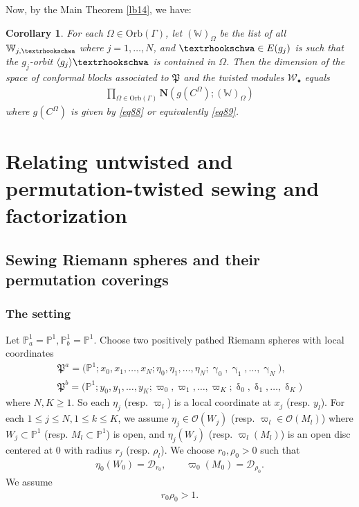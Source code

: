 \documentclass[12pt,a4paper,notitlepage]{article}
\theoremstyle{definition}
\theoremstyle{plain}
\newtheorem{co}[df]{Corollary}
\newcommand{\fk}{\mathfrak}
\newcommand{\mc}{\mathcal}
\newcommand{\bk}[1]{\langle {#1}\rangle}
\newcommand{\scr}{\mathscr}
\newcommand{\blt}{\bullet}
\newcommand{\Wbb}{\mathbb W}
\newcommand{\Pbb}{\mathbb P}
\newcommand{\Nbf}{\mathbf N}
\newcommand{\Orb}{\mathrm{Orb}}
\newcommand{\tipae}{\text{\textrhookschwa}}
\numberwithin{equation}{subsection}
\begin{document}
\begin{subappendices}
Now, by the Main Theorem \ref{lb14}, we have:

\begin{co}
For each $\Omega\in\Orb(\Gamma)$, let $(\Wbb)_\Omega$ be the list of all $\Wbb_{j,\tipae}$ where $j=1,\dots,N$, and $\tipae\in E(g_j)$ is such that the $g_j$-orbit $\bk{g_j}\tipae$ is contained in $\Omega$. Then the dimension of the space of conformal blocks associated to $\fk P$ and the twisted modules $\mc W_\blt$ equals
\begin{align*}
\prod_{\Omega\in\Orb(\Gamma)}\Nbf(g(C^\Omega);(\Wbb)_\Omega)	
\end{align*}
where $g(C^\Omega)$ is given by \eqref{eq88} or equivalently \eqref{eq89}.
\end{co}










	
\end{subappendices}	


\section{Relating untwisted and permutation-twisted sewing and factorization}\label{lb35}

\subsection{Sewing Riemann spheres and their permutation coverings}\label{lb59}


\subsubsection{The setting}\label{lb45}

Let $\Pbb^1_a=\Pbb^1,\Pbb^1_b=\Pbb^1$. Choose two positively pathed Riemann spheres with local coordinates
\begin{gather*}
\fk P^a=\big(\Pbb^1;x_0,x_1,\dots,x_N;\eta_0,\eta_1,\dots,\eta_N;\upgamma_0,\upgamma_1,\dots,\upgamma_N\big),\\
\fk P^b=\big(\Pbb^1;y_0,y_1,\dots,y_K;\varpi_0,\varpi_1,\dots,\varpi_K;\updelta_0,\updelta_1,\dots,\updelta_K\big)	
\end{gather*}
where $N,K\geq 1$. So each $\eta_j$ (resp. $\varpi_l$) is a local coordinate at $x_j$ (resp. $y_l$). For each $1\leq j\leq N,1\leq k\leq K$, we assume $\eta_j\in\scr O(W_j)$ (resp. $\varpi_l\in\scr O(M_l)$) where $W_j\subset\Pbb^1$ (resp. $M_l\subset\Pbb^1$) is open, and $\eta_j(W_j)$ (resp. $\varpi_l(M_l)$) is an open disc centered at $0$ with radius $r_j$ (resp. $\rho_l$). We choose  $r_0,\rho_0>0$ such that
\begin{gather*}
\eta_0(W_0)=\mc D_{r_0},\qquad\varpi_0(M_0)=\mc D_{\rho_0}.	
\end{gather*}
We assume
\begin{align*}
r_0\rho_0>1.	
\end{align*}
\end{document}
